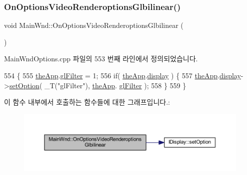 \subsubsection{\texorpdfstring{On\+Options\+Video\+Renderoptions\+Glbilinear()}{OnOptionsVideoRenderoptionsGlbilinear()}}
{\footnotesize\ttfamily void Main\+Wnd\+::\+On\+Options\+Video\+Renderoptions\+Glbilinear (\begin{DoxyParamCaption}{ }\end{DoxyParamCaption})\hspace{0.3cm}{\ttfamily [protected]}}



Main\+Wnd\+Options.\+cpp 파일의 553 번째 라인에서 정의되었습니다.


\begin{DoxyCode}
554 \{
555     \mbox{\hyperlink{_v_b_a_8cpp_a8095a9d06b37a7efe3723f3218ad8fb3}{theApp}}.\mbox{\hyperlink{class_v_b_a_a7861cd60864163f310ae87f746eba9e6}{glFilter}} = 1;
556     \textcolor{keywordflow}{if}( \mbox{\hyperlink{_v_b_a_8cpp_a8095a9d06b37a7efe3723f3218ad8fb3}{theApp}}.\mbox{\hyperlink{class_v_b_a_a940e5bad8b3ed2436888dbcd03bfd563}{display}} ) \{
557         \mbox{\hyperlink{_v_b_a_8cpp_a8095a9d06b37a7efe3723f3218ad8fb3}{theApp}}.\mbox{\hyperlink{class_v_b_a_a940e5bad8b3ed2436888dbcd03bfd563}{display}}->\mbox{\hyperlink{class_i_display_a1766244708c252bb8781892c76c20ba9}{setOption}}( \_T(\textcolor{stringliteral}{"glFilter"}), \mbox{\hyperlink{_v_b_a_8cpp_a8095a9d06b37a7efe3723f3218ad8fb3}{theApp}}.
      \mbox{\hyperlink{class_v_b_a_a7861cd60864163f310ae87f746eba9e6}{glFilter}} );
558     \}
559 \}
\end{DoxyCode}
이 함수 내부에서 호출하는 함수들에 대한 그래프입니다.\+:
\nopagebreak
\begin{figure}[H]
\begin{center}
\leavevmode
\includegraphics[width=350pt]{class_main_wnd_afff6d21ce58320731fae2b0f38390640_cgraph}
\end{center}
\end{figure}
\mbox{\label{class_main_wnd_a02eb06936ef0d4723a0bf743db3d929b}} 
